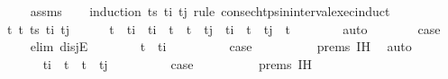 \begin{isabellebody}
\ \ \ \ \isamarkupfalse%
\ assms\isanewline
\ \ \isamarkupfalse%
\ {\isacharparenleft}{\kern0pt}induction\ ts\ t\isactrlsub i\ t\isactrlsub j\ rule{\isacharcolon}{\kern0pt}\ consec{\isacharunderscore}{\kern0pt}htps{\isacharunderscore}{\kern0pt}in{\isacharunderscore}{\kern0pt}interval{\isacharunderscore}{\kern0pt}exec{\isachardot}{\kern0pt}induct{\isacharparenright}{\kern0pt}\isanewline
\ \ \ \ \isamarkupfalse%
\ {\isacharparenleft}{\kern0pt}{}\ t\ t{\isacharprime}{\kern0pt}\ ts\ t\isactrlsub i\ t\isactrlsub j{\isacharparenright}{\kern0pt}\isanewline
\ \ \ \ \isamarkupfalse%
\ {\isachardoublequoteopen}t\ {\isacharless}{\kern0pt}\ t\isactrlsub i\ {\isasymor}\ {\isacharparenleft}{\kern0pt}t\isactrlsub i\ {\isasymle}\ t\ {\isasymand}\ t{\isacharprime}{\kern0pt}\ {\isasymle}\ t\isactrlsub j{\isacharparenright}{\kern0pt}\ {\isasymor}\ {\isacharparenleft}{\kern0pt}t\isactrlsub i\ {\isasymle}\ t\ {\isasymand}\ t\isactrlsub j\ {\isacharless}{\kern0pt}\ t{\isacharprime}{\kern0pt}{\isacharparenright}{\kern0pt}{\isachardoublequoteclose}\isanewline
\ \ \ \ \ \ \isamarkupfalse%
\ auto\isanewline
\ \ \ \ \isamarkupfalse%
\ \isamarkupfalse%
\ {\isacharquery}{\kern0pt}case\ \isanewline
\ \ \ \ \isamarkupfalse%
\ {\isacharparenleft}{\kern0pt}elim\ disjE{\isacharparenright}{\kern0pt}\isanewline
\ \ \ \ \ \ \isamarkupfalse%
\ {\isachardoublequoteopen}t\ {\isacharless}{\kern0pt}\ t\isactrlsub i{\isachardoublequoteclose}\isanewline
\ \ \ \ \ \ \isamarkupfalse%
\ \isamarkupfalse%
\ {\isacharquery}{\kern0pt}case\isanewline
\ \ \ \ \ \ \ \ \isamarkupfalse%
\ {\isachardoublequoteopen}{}{\isachardot}{\kern0pt}prems{\isachardoublequoteclose}\ {\isachardoublequoteopen}{}{\isachardot}{\kern0pt}IH{\isachardoublequoteclose}\ \isamarkupfalse%
\ auto\isanewline
\ \ \ \ \isamarkupfalse%
\isanewline
\ \ \ \ \ \ \isamarkupfalse%
\ {\isachardoublequoteopen}t\isactrlsub i\ {\isasymle}\ t\ {\isasymand}\ t{\isacharprime}{\kern0pt}\ {\isasymle}\ t\isactrlsub j{\isachardoublequoteclose}\isanewline
\ \ \ \ \ \ \isamarkupfalse%
\ \isamarkupfalse%
\ {\isacharquery}{\kern0pt}case\isanewline
\ \ \ \ \ \ \ \ \isamarkupfalse%
\ {\isachardoublequoteopen}{}{\isachardot}{\kern0pt}prems{\isachardoublequoteclose}\ {\isachardoublequoteopen}{}{\isachardot}{\kern0pt}IH{\isachardoublequoteclose}\ \isamarkupfalse%

\end{isabellebody}
